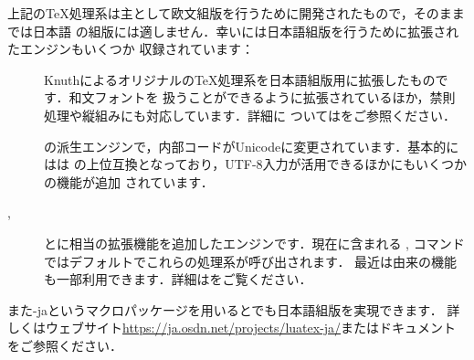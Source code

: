 \documentclass[uplatex,dvipdfmx]{jsarticle}
\begin{document}
上記の\TeX 処理系は主として欧文組版を行うために開発されたもので，そのままでは日本語
の組版には適しません．幸い\TL には日本語組版を行うために拡張されたエンジンもいくつか
収録されています：
%
\begin{description}
\item[\pTeX]
Knuthによるオリジナルの\TeX 処理系を日本語組版用に拡張したものです．和文フォントを
扱うことができるように拡張されているほか，禁則処理や縦組みにも対応しています．詳細に
ついてはをご参照ください．

\item[\upTeX]
\pTeX の派生エンジンで，内部コードがUnicodeに変更されています．基本的には\upTeX は
\pTeX の上位互換となっており，UTF-8入力が活用できるほかにもいくつかの機能が追加
されています．

\item[\epTeX, \eupTeX]
\pTeX と\upTeX に\eTeX 相当の拡張機能を追加したエンジンです．現在\TL に含まれる
, コマンドではデフォルトでこれらの処理系が呼び出されます．
最近は\pdfTeX 由来の機能も一部利用できます．詳細はをご覧ください．
\end{description}

また\LuaTeX-jaというマクロパッケージを用いると\LuaTeX でも日本語組版を実現できます．
詳しくはウェブサイト\url{https://ja.osdn.net/projects/luatex-ja/}またはドキュメント
をご参照ください．
\end{document}

